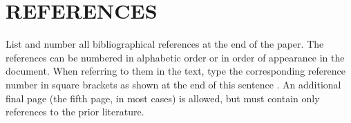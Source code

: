 \documentclass{article}
\begin{document}
\section{REFERENCES}
\label{sec:ref}

List and number all bibliographical references at the end of the
paper. The references can be numbered in alphabetic order or in
order of appearance in the document. When referring to them in
the text, type the corresponding reference number in square
brackets as shown at the end of this sentence \cite{C2}. An
additional final page (the fifth page, in most cases) is
allowed, but must contain only references to the prior
literature.



\end{document}
